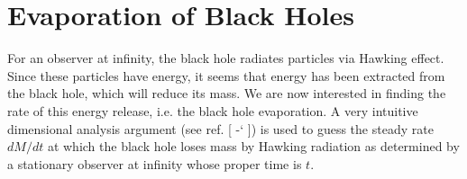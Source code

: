 \documentclass[%
 aip,
 jmp,%
 amsmath,amssymb,
 reprint,%
]{revtex4-1}
\newcommand*{\citen}[1]{%
  \begingroup
    \romannumeral-`\x %
    \setcitestyle{numbers}%
    \cite{#1}%
  \endgroup   
}
\begin{document}
\section{Evaporation of Black Holes}
For an observer at infinity, the black hole radiates particles via Hawking effect. Since these particles have energy, it seems that energy has been extracted from the black hole, which will reduce its mass. We are now interested in finding the rate of this energy release, i.e. the black hole evaporation. A very intuitive dimensional analysis argument (see ref. [\citen{hartlegrav}]) is used to guess the steady rate $dM/dt$ at which the black hole loses mass by Hawking radiation as determined by a stationary observer at infinity whose proper time is $t$.\\

\newpage
\end{document}
